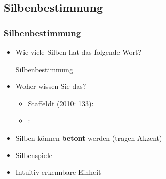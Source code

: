 \begin{frame}
%	


\end{frame}



\subsection{Silbenbestimmung}

\begin{frame}
\frametitle{Silbenbestimmung}

\begin{itemize}
	\item<1-> Wie viele Silben hat das folgende Wort?
	
	  \ea
          Silbenbestimmung
          \z
          
	
	\item<2-> Woher wissen Sie das?
	
	\begin{itemize}
		\item<2-> Staffeldt (2010: 133):\\
		
		\item<2-> \citet[600]{Bussmann02a}:\\
		
	\end{itemize}

	\item<2-> Silben können \textbf{betont} werden (tragen Akzent)
	
	\item<2-> Silbenspiele
	
	\item<2-> Intuitiv erkennbare Einheit

\end{itemize}

\end{frame}



